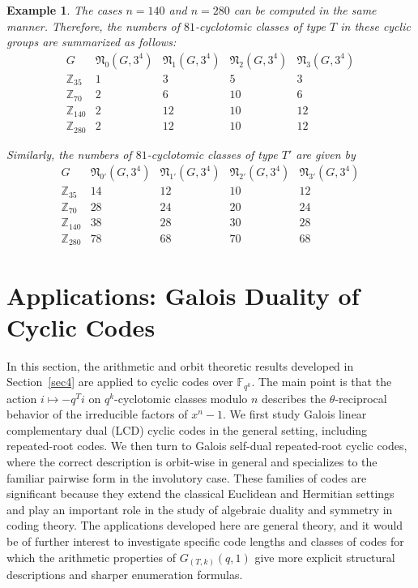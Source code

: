 \documentclass[pdflatex,sn-mathphys-num]{sn-jnl}%
\theoremstyle{thmstyleone}%
\theoremstyle{thmstyletwo}%
\newtheorem{example}{Example}%
\theoremstyle{thmstylethree}%
\newcommand{\Z}{\mathbb{Z}}
\newcommand{\F}{\mathbb{F}}
\begin{document}
\begin{example}
 The cases $n=140$ and $n=280$ can be computed in the same manner.
Therefore, the numbers of $81$-cyclotomic classes of type $T$ in these cyclic groups are summarized as follows:
\[
\begin{array}{c|cccc}
G & \mathfrak N_0(G,3^4) & \mathfrak N_1(G,3^4) & \mathfrak N_2(G,3^4) & \mathfrak N_3(G,3^4)\\
\hline
\Z_{35}  & 1 & 3  & 5  & 3 \\
\Z_{70}  & 2 & 6  & 10 & 6 \\
\Z_{140} & 2 & 12 & 10 & 12 \\
\Z_{280} & 2 & 12 & 10 & 12
\end{array}
\]

Similarly, the numbers of $81$-cyclotomic classes of type $T'$ are given by
\[
\begin{array}{c|cccc}
G & \mathfrak N_{0'}(G,3^4) & \mathfrak N_{1'}(G,3^4) & \mathfrak N_{2'}(G,3^4) & \mathfrak N_{3'}(G,3^4)\\
\hline
\Z_{35}  & 14 & 12 & 10 & 12 \\
\Z_{70}  & 28 & 24 & 20 & 24 \\
\Z_{140} & 38 & 28 & 30 & 28 \\
\Z_{280} & 78 & 68 & 70 & 68
\end{array}
\]
\end{example}



\section{Applications: Galois Duality of Cyclic Codes}
\label{sec5}


In this section, the arithmetic and orbit theoretic results developed in Section~\ref{sec4} are applied to cyclic codes over $\F_{q^k}$. The main point is that the action
$
i\mapsto -q^Ti$
on $q^k$-cyclotomic classes modulo $n$ describes the $\theta$-reciprocal behavior of the irreducible factors of $x^n-1$. We first study Galois linear complementary dual  (LCD) cyclic codes in the general setting, including repeated-root codes. We then turn to Galois self-dual repeated-root cyclic codes, where the correct description is orbit-wise in general and specializes to the familiar pairwise form in the involutory case. These families of codes are significant because they extend the classical Euclidean and Hermitian settings and play an important role in the study of algebraic duality and symmetry in coding theory.  The applications developed here are    general theory, and it would be of further interest to investigate specific code lengths and classes of codes for which the arithmetic properties of $G_{(T,k)}(q,1)$ give more explicit structural descriptions and sharper enumeration formulas.
\end{document}
